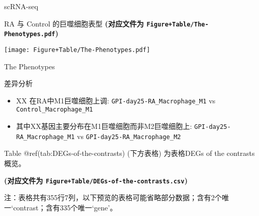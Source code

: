 \documentclass[
  ignorenonframetext,
]{beamer}
\providecommand{\tightlist}{%
  \setlength{\itemsep}{0pt}\setlength{\parskip}{0pt}}
\begin{document}
\begin{frame}[fragile]{scRNA-seq}
\begin{block}{RA 与 Control 的巨噬细胞表型}
\textbf{(对应文件为 \texttt{Figure+Table/The-Phenotypes.pdf})}

\def\@captype{figure}
\begin{center}
\texttt{[image: Figure+Table/The-Phenotypes.pdf]}
\caption{The Phenotypes}\label{fig:The-Phenotypes}
\end{center}

\begin{center}\vspace{1.5cm}\end{center}
\end{block}

\begin{block}{差异分析}
\protect\hypertarget{ux5deeux5f02ux5206ux6790}{}
\begin{itemize}
\tightlist
\item
  XX 在RA中M1巨噬细胞上调: \texttt{GPI-day25-RA\_Macrophage\_M1} vs
  \texttt{Control\_Macrophage\_M1}
\item
  其中XX基因主要分布在M1巨噬细胞而非M2巨噬细胞上:
  \texttt{GPI-day25-RA\_Macrophage\_M1} vs
  \texttt{GPI-day25-RA\_Macrophage\_M2}
\end{itemize}

\begin{center}\vspace{1.5cm}\end{center}

Table @ref(tab:DEGs-of-the-contrasts) (下方表格) 为表格DEGs of the
contrasts概览。

\textbf{(对应文件为 \texttt{Figure+Table/DEGs-of-the-contrasts.csv})}

\begin{center}\begin{tcolorbox}[colback=gray!10, colframe=gray!50, width=0.9\linewidth, arc=1mm, boxrule=0.5pt]注：表格共有355行7列，以下预览的表格可能省略部分数据；含有2个唯一`contrast；含有335个唯一`gene'。
\end{tcolorbox}
\end{center}


\end{block}
\end{frame}
\end{document}
